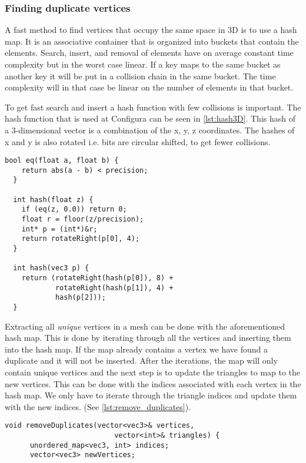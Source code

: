\begin{subs}
\subsubsection{Finding duplicate vertices}
A fast method to find vertices that occupy the same space in 3D is to use a hash map. It is an associative container that is organized into buckets that contain the elements. Search, insert, and removal of elements have on average constant time complexity but in the worst case linear. If a key maps to the same bucket as another key it will be put in a collision chain in the same bucket. The time complexity will in that case be linear on the number of elements in that bucket.

To get fast search and insert a hash function with few collisions is important. The hash function that is used at Configura can be seen in \cref{lst:hash3D}. This hash of a 3-dimensional vector is a combination of the x, y, z coordinates. The hashes of x and y is also rotated i.e. bits are circular shifted, to get fewer collisions. 

\begin{minipage}{\textwidth}
\begin{lstlisting}[caption={Hashing 3D point}, label={lst:hash3D}]
  bool eq(float a, float b) {
    return abs(a - b) < precision;
  }
  
  int hash(float z) {
    if (eq(z, 0.0)) return 0;
    float r = floor(z/precision);
    int* p = (int*)&r;
    return rotateRight(p[0], 4);
  }
  
  int hash(vec3 p) {
    return (rotateRight(hash(p[0]), 8) +
            rotateRight(hash(p[1]), 4) +
            hash(p[2]));
  }
\end{lstlisting}
\end{minipage}

Extracting all \emph{unique} vertices in a mesh can be done with the aforementioned hash map. This is done by iterating through all the vertices and inserting them into the hash map. If the map already contains a vertex we have found a duplicate and it will not be inserted. After the iterations, the map will only contain unique vertices and the next step is to update the triangles to map to the new vertices. This can be done with the indices associated with each vertex in the hash map. We only have to iterate through the triangle indices and update them with the new indices. (See \cref{lst:remove_duplicates}).

\begin{minipage}{\textwidth}
  \begin{lstlisting}[caption={Removing duplicates}, label={lst:remove_duplicates}]
    void removeDuplicates(vector<vec3>& vertices,
                          vector<int>& triangles) {
      unordered_map<vec3, int> indices;
      vector<vec3> newVertices;
      

\end{lstlisting}
\end{minipage}
\end{subs}

